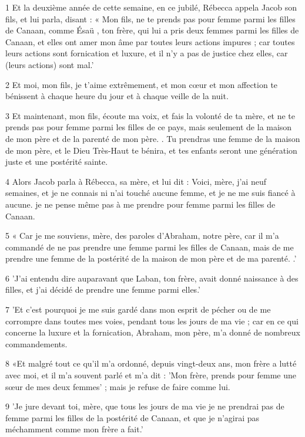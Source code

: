 \par 1 Et la deuxième année de cette semaine, en ce jubilé, Rébecca appela Jacob son fils, et lui parla, disant : « Mon fils, ne te prends pas pour femme parmi les filles de Canaan, comme Ésaü , ton frère, qui lui a pris deux femmes parmi les filles de Canaan, et elles ont amer mon âme par toutes leurs actions impures ; car toutes leurs actions sont fornication et luxure, et il n'y a pas de justice chez elles, car (leurs actions) sont mal.'
\par 2 Et moi, mon fils, je t'aime extrêmement, et mon cœur et mon affection te bénissent à chaque heure du jour et à chaque veille de la nuit.
\par 3 Et maintenant, mon fils, écoute ma voix, et fais la volonté de ta mère, et ne te prends pas pour femme parmi les filles de ce pays, mais seulement de la maison de mon père et de la parenté de mon père. . Tu prendras une femme de la maison de mon père, et le Dieu Très-Haut te bénira, et tes enfants seront une génération juste et une postérité sainte.
\par 4 Alors Jacob parla à Rébecca, sa mère, et lui dit : Voici, mère, j'ai neuf semaines, et je ne connais ni n'ai touché aucune femme, et je ne me suis fiancé à aucune. je ne pense même pas à me prendre pour femme parmi les filles de Canaan.
\par 5 « Car je me souviens, mère, des paroles d'Abraham, notre père, car il m'a commandé de ne pas prendre une femme parmi les filles de Canaan, mais de me prendre une femme de la postérité de la maison de mon père et de ma parenté. .'
\par 6 'J'ai entendu dire auparavant que Laban, ton frère, avait donné naissance à des filles, et j'ai décidé de prendre une femme parmi elles.'
\par 7 'Et c'est pourquoi je me suis gardé dans mon esprit de pécher ou de me corrompre dans toutes mes voies, pendant tous les jours de ma vie ; car en ce qui concerne la luxure et la fornication, Abraham, mon père, m'a donné de nombreux commandements.
\par 8 «Et malgré tout ce qu'il m'a ordonné, depuis vingt-deux ans, mon frère a lutté avec moi, et il m'a souvent parlé et m'a dit : 'Mon frère, prends pour femme une sœur de mes deux femmes' ; mais je refuse de faire comme lui.
\par 9 'Je jure devant toi, mère, que tous les jours de ma vie je ne prendrai pas de femme parmi les filles de la postérité de Canaan, et que je n'agirai pas méchamment comme mon frère a fait.'

